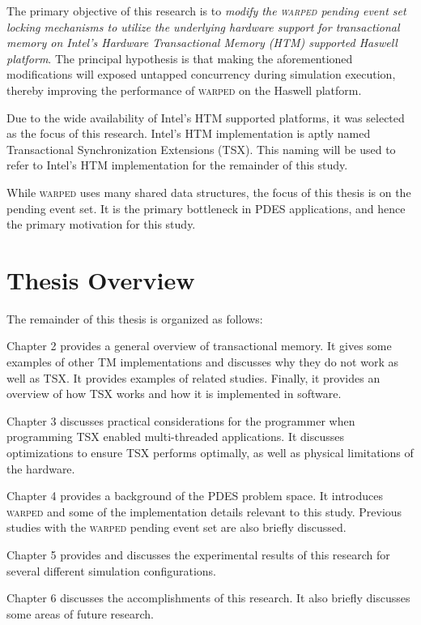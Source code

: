 \documentclass[11pt]{book}
\begin{document}
The primary objective of this research is to \emph{modify the \textsc{warped} pending event set
  locking mechanisms to utilize the underlying hardware support for transactional memory
  on Intel's Hardware Transactional Memory (HTM) supported Haswell platform}.  The
principal hypothesis is that making the aforementioned modifications will exposed untapped
concurrency during simulation execution, thereby improving the performance of \textsc{warped} on
the Haswell platform.

Due to the wide availability of Intel's HTM supported platforms, it was selected as the
focus of this research.  Intel's HTM implementation is aptly named Transactional
Synchronization Extensions (TSX).  This naming will be used to refer to Intel's HTM
implementation for the remainder of this study.

While \textsc{warped} uses many shared data structures, the focus of this thesis is on the
pending event set.  It is the primary bottleneck in PDES applications, and hence the
primary motivation for this study.

\section{Thesis Overview}

The remainder of this thesis is organized as follows:

Chapter 2 provides a general overview of transactional memory.  It gives some examples of
other TM implementations and discusses why they do not work as well as TSX.  It provides
examples of related studies.  Finally, it provides an overview of how TSX works and how it
is implemented in software.

Chapter 3 discusses practical considerations for the programmer when programming TSX
enabled multi-threaded applications.  It discusses optimizations to ensure TSX performs
optimally, as well as physical limitations of the hardware.

Chapter 4 provides a background of the PDES problem space.  It introduces \textsc{warped}
and some of the implementation details relevant to this study.  Previous studies with the
\textsc{warped} pending event set are also briefly discussed.

Chapter 5 provides and discusses the experimental results of this research for several
different simulation configurations.

Chapter 6 discusses the accomplishments of this research.  It also briefly discusses some
areas of future research.
\end{document}

